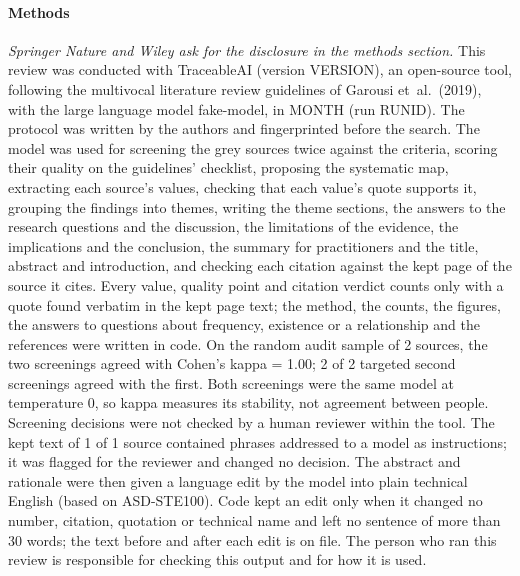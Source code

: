 \documentclass[10pt,a4paper]{article}
\begin{document}
\paragraph{Methods}
\textit{Springer Nature and Wiley ask for the disclosure in the methods section.} This review was conducted with TraceableAI (version VERSION), an open-source tool, following the multivocal literature review guidelines of Garousi et~al.\ (2019), with the large language model fake-model, in MONTH (run RUNID). The protocol was written by the authors and fingerprinted before the search. The model was used for screening the grey sources twice against the criteria, scoring their quality on the guidelines' checklist, proposing the systematic map, extracting each source's values, checking that each value's quote supports it, grouping the findings into themes, writing the theme sections, the answers to the research questions and the discussion, the limitations of the evidence, the implications and the conclusion, the summary for practitioners and the title, abstract and introduction, and checking each citation against the kept page of the source it cites. Every value, quality point and citation verdict counts only with a quote found verbatim in the kept page text; the method, the counts, the figures, the answers to questions about frequency, existence or a relationship and the references were written in code. On the random audit sample of 2 sources, the two screenings agreed with Cohen's kappa = 1.00; 2 of 2 targeted second screenings agreed with the first. Both screenings were the same model at temperature 0, so kappa measures its stability, not agreement between people. Screening decisions were not checked by a human reviewer within the tool. The kept text of 1 of 1 source contained phrases addressed to a model as instructions; it was flagged for the reviewer and changed no decision. The abstract and rationale were then given a language edit by the model into plain technical English (based on ASD-STE100). Code kept an edit only when it changed no number, citation, quotation or technical name and left no sentence of more than 30 words; the text before and after each edit is on file. The person who ran this review is responsible for checking this output and for how it is used.\par
\end{document}
